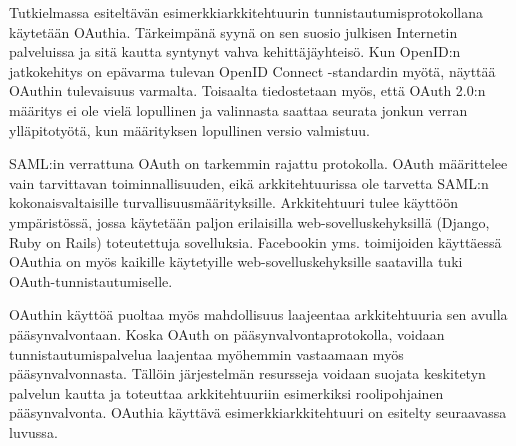 Tutkielmassa esiteltävän esimerkkiarkkitehtuurin tunnistautumisprotokollana käytetään OAuthia. Tärkeimpänä syynä on sen suosio julkisen Internetin palveluissa ja sitä kautta syntynyt vahva kehittäjäyhteisö. Kun OpenID:n jatkokehitys on epävarma tulevan OpenID Connect -standardin myötä, näyttää OAuthin tulevaisuus varmalta. Toisaalta tiedostetaan myös, että OAuth 2.0:n määritys ei ole vielä lopullinen ja valinnasta saattaa seurata jonkun verran ylläpitotyötä, kun määrityksen lopullinen versio valmistuu.

SAML:in verrattuna OAuth on tarkemmin rajattu protokolla. OAuth määrittelee vain tarvittavan toiminnallisuuden, eikä arkkitehtuurissa ole tarvetta SAML:n kokonaisvaltaisille turvallisuusmäärityksille. Arkkitehtuuri tulee käyttöön ympäristössä, jossa käytetään paljon erilaisilla web-sovelluskehyksillä (Django, Ruby on Rails) toteutettuja sovelluksia. Facebookin yms. toimijoiden käyttäessä OAuthia on myös kaikille käytetyille web-sovelluskehyksille saatavilla tuki OAuth-tunnistautumiselle.

OAuthin käyttöä puoltaa myös mahdollisuus laajeentaa arkkitehtuuria sen avulla pääsynvalvontaan. Koska OAuth on pääsynvalvontaprotokolla, voidaan tunnistautumispalvelua laajentaa myöhemmin vastaamaan myös pääsynvalvonnasta. Tällöin järjestelmän resursseja voidaan suojata keskitetyn palvelun kautta ja toteuttaa arkkitehtuuriin esimerkiksi roolipohjainen pääsynvalvonta. OAuthia käyttävä esimerkkiarkkitehtuuri on esitelty seuraavassa luvussa.